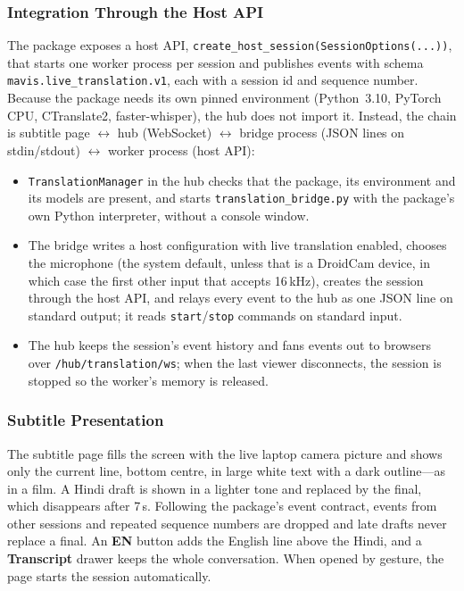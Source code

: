 \documentclass[12pt,singleside,a4paper]{article}
\begin{document}
\subsubsection{Integration Through the Host API}
The package exposes a host API, \texttt{create\_host\_session(SessionOptions(...))}, that starts one worker process per session and publishes events with schema \texttt{mavis.live\_translation.v1}, each with a session id and sequence number. Because the package needs its own pinned environment (Python~3.10, PyTorch CPU, CTranslate2, faster-whisper), the hub does not import it. Instead, the chain is subtitle page $\leftrightarrow$ hub (WebSocket) $\leftrightarrow$ bridge process (JSON lines on stdin/stdout) $\leftrightarrow$ worker process (host API):
\begin{itemize}[leftmargin=*]
\item \texttt{TranslationManager} in the hub checks that the package, its environment and its models are present, and starts \texttt{translation\_bridge.py} with the package's own Python interpreter, without a console window.
\item The bridge writes a host configuration with live translation enabled, chooses the microphone (the system default, unless that is a DroidCam device, in which case the first other input that accepts 16\,kHz), creates the session through the host API, and relays every event to the hub as one JSON line on standard output; it reads \texttt{start}/\texttt{stop} commands on standard input.
\item The hub keeps the session's event history and fans events out to browsers over \texttt{/hub/translation/ws}; when the last viewer disconnects, the session is stopped so the worker's memory is released.
\end{itemize}



\subsubsection{Subtitle Presentation}
The subtitle page fills the screen with the live laptop camera picture and shows only the current line, bottom centre, in large white text with a dark outline---as in a film. A Hindi draft is shown in a lighter tone and replaced by the final, which disappears after 7\,s. Following the package's event contract, events from other sessions and repeated sequence numbers are dropped and late drafts never replace a final. An \textbf{EN} button adds the English line above the Hindi, and a \textbf{Transcript} drawer keeps the whole conversation. When opened by gesture, the page starts the session automatically.
\end{document}
